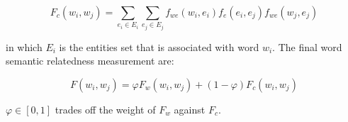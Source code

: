 \begin{small}
    \begin{equation}
        F_c(w_i, w_j) = \sum_{e_i \in E_i}^{ }\sum_{e_j \in E_j}^{ }f_{we}(w_i, e_i)f_e(e_i, e_j)f_{we}(w_j, e_j)
    \end{equation}
\end{small}in which $E_i$ is the entities set that is associated with word $w_i$.
The final word semantic relatedness measurement are:

\begin{small}
    \begin{equation}
        F(w_i, w_j) = \varphi F_w(w_i, w_j) + (1 - \varphi) F_c(w_i, w_j)
    \end{equation}
\end{small} $\varphi \in [0,1]$ trades off the weight of $F_w$ against $F_c$.




